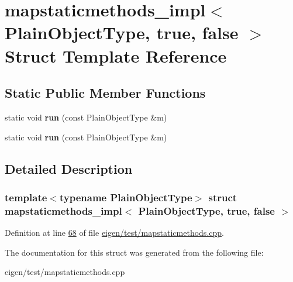 \hypertarget{structmapstaticmethods__impl_3_01_plain_object_type_00_01true_00_01false_01_4}{}\section{mapstaticmethods\+\_\+impl$<$ Plain\+Object\+Type, true, false $>$ Struct Template Reference}
\label{structmapstaticmethods__impl_3_01_plain_object_type_00_01true_00_01false_01_4}
\subsection*{Static Public Member Functions}
\begin{DoxyCompactItemize}
\item 
\mbox{\label{structmapstaticmethods__impl_3_01_plain_object_type_00_01true_00_01false_01_4_aeb8a10a4b2c0e3e3bb8ef6c4411e5039}} 
static void {\bfseries run} (const Plain\+Object\+Type \&m)
\item 
\mbox{\label{structmapstaticmethods__impl_3_01_plain_object_type_00_01true_00_01false_01_4_aeb8a10a4b2c0e3e3bb8ef6c4411e5039}} 
static void {\bfseries run} (const Plain\+Object\+Type \&m)
\end{DoxyCompactItemize}


\subsection{Detailed Description}
\subsubsection*{template$<$typename Plain\+Object\+Type$>$\newline
struct mapstaticmethods\+\_\+impl$<$ Plain\+Object\+Type, true, false $>$}



Definition at line \hyperlink{eigen_2test_2mapstaticmethods_8cpp_source_l00068}{68} of file \hyperlink{eigen_2test_2mapstaticmethods_8cpp_source}{eigen/test/mapstaticmethods.\+cpp}.



The documentation for this struct was generated from the following file\+:\begin{DoxyCompactItemize}
\item 
eigen/test/mapstaticmethods.\+cpp\end{DoxyCompactItemize}
